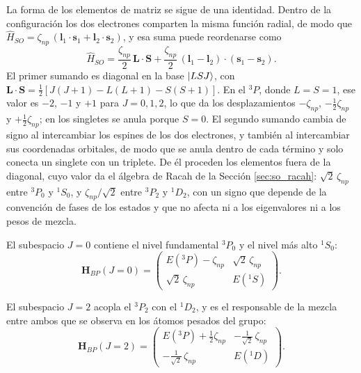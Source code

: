 La forma de los elementos de matriz se sigue de una identidad. Dentro de la configuración los dos electrones comparten la misma función radial, de modo que $\hat{H}_{SO} = \zeta_{np}\,(\mathbf{l}_1\cdot\mathbf{s}_1 + \mathbf{l}_2\cdot\mathbf{s}_2)$, y esa suma puede reordenarse como
\begin{equation}
    \label{eq:so_identidad}
    \hat{H}_{SO} = \frac{\zeta_{np}}{2}\,\mathbf{L}\cdot\mathbf{S} + \frac{\zeta_{np}}{2}\,(\mathbf{l}_1 - \mathbf{l}_2)\cdot(\mathbf{s}_1 - \mathbf{s}_2).
\end{equation}
El primer sumando es diagonal en la base $\ket{LSJ}$, con $\mathbf{L}\cdot\mathbf{S} = \tfrac{1}{2}[J(J+1) - L(L+1) - S(S+1)]$. En el $^3P$, donde $L = S = 1$, ese valor es $-2$, $-1$ y $+1$ para $J = 0, 1, 2$, lo que da los desplazamientos $-\zeta_{np}$, $-\tfrac{1}{2}\zeta_{np}$ y $+\tfrac{1}{2}\zeta_{np}$; en los singletes se anula porque $S = 0$. El segundo sumando cambia de signo al intercambiar los espines de los dos electrones, y también al intercambiar sus coordenadas orbitales, de modo que se anula dentro de cada término y solo conecta un singlete con un triplete. De él proceden los elementos fuera de la diagonal, cuyo valor da el álgebra de Racah de la Sección \ref{sec:so_racah}: $\sqrt{2}\,\zeta_{np}$ entre $^3P_0$ y $^1S_0$, y $\zeta_{np}/\sqrt{2}$ entre $^3P_2$ y $^1D_2$, con un signo que depende de la convención de fases de los estados y que no afecta ni a los eigenvalores ni a los pesos de mezcla.

El subespacio $J=0$ contiene el nivel fundamental $^3P_0$ y el nivel más alto $^1S_0$:
\begin{equation}
    \label{eq:bp_j0}
    \bm{H}_{BP}(J=0) = \begin{pmatrix}
        E(^3P) - \zeta_{np} & \sqrt{2}\,\zeta_{np} \\[2pt]
        \sqrt{2}\,\zeta_{np} & E(^1S)
    \end{pmatrix}.
\end{equation}

El subespacio $J=2$ acopla el $^3P_2$ con el $^1D_2$, y es el responsable de la mezcla entre ambos que se observa en los átomos pesados del grupo:
\begin{equation}
    \label{eq:bp_j2}
    \bm{H}_{BP}(J=2) = \begin{pmatrix}
        E(^3P) + \tfrac{1}{2}\zeta_{np} & -\tfrac{1}{\sqrt{2}}\,\zeta_{np} \\[2pt]
        -\tfrac{1}{\sqrt{2}}\,\zeta_{np} & E(^1D)
    \end{pmatrix}.
\end{equation}

